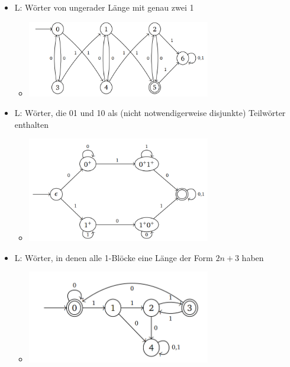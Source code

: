 \documentclass[11pt,a4paper]{article}
\begin{document}
\begin{itemize}
\item L: Wörter von ungerader Länge mit genau zwei 1
	\begin{itemize}
	\item[]
		\begin{center}
		\includegraphics[width=8cm]{Bilder/auto4}
		\end{center}	
	\end{itemize}
	
\item L: Wörter, die 01 und 10 als (nicht notwendigerweise disjunkte) Teilwörter enthalten
	\begin{itemize}
	\item[]
		\begin{center}
		\includegraphics[width=8cm]{Bilder/auto5}
		\end{center}	
	\end{itemize}

\item L: Wörter, in denen alle 1-Blöcke eine Länge der Form $2n+3$ haben
	\begin{itemize}
	\item[]
		\begin{center}
		\includegraphics[width=8cm]{Bilder/auto6}
		\end{center}	
	\end{itemize}
	

\end{itemize}
\end{document}

